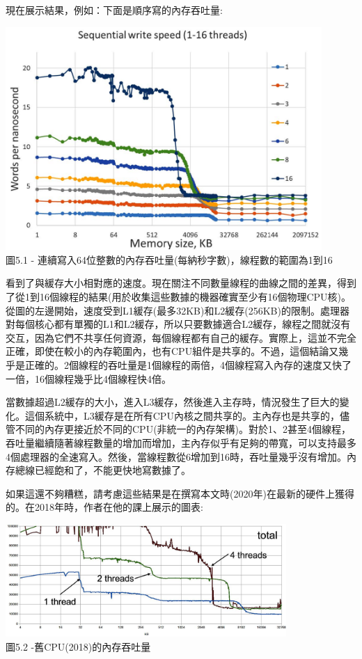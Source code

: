 現在展示結果，例如：下面是順序寫的內存吞吐量:

\begin{center}
\includegraphics[width=0.9\textwidth]{content/1/chapter5/images/1.jpg}\\
圖5.1 - 連續寫入64位整數的內存吞吐量(每納秒字數)，線程數的範圍為1到16
\end{center}

看到了與緩存大小相對應的速度。現在關注不同數量線程的曲線之間的差異，得到了從1到16個線程的結果(用於收集這些數據的機器確實至少有16個物理CPU核)。從圖的左邊開始，速度受到L1緩存(最多32KB)和L2緩存(256KB)的限制。處理器對每個核心都有單獨的L1和L2緩存，所以只要數據適合L2緩存，線程之間就沒有交互，因為它們不共享任何資源，每個線程都有自己的緩存。實際上，這並不完全正確，即使在較小的內存範圍內，也有CPU組件是共享的。不過，這個結論又幾乎是正確的。2個線程的吞吐量是1個線程的兩倍，4個線程寫入內存的速度又快了一倍，16個線程幾乎比4個線程快4倍。

當數據超過L2緩存的大小，進入L3緩存，然後進入主存時，情況發生了巨大的變化。這個系統中，L3緩存是在所有CPU內核之間共享的。主內存也是共享的，儘管不同的內存更接近於不同的CPU(非統一的內存架構)。對於1、2甚至4個線程，吞吐量繼續隨著線程數量的增加而增加，主內存似乎有足夠的帶寬，可以支持最多4個處理器的全速寫入。然後，當線程數從6增加到16時，吞吐量幾乎沒有增加。內存總線已經飽和了，不能更快地寫數據了。

如果這還不夠糟糕，請考慮這些結果是在撰寫本文時(2020年)在最新的硬件上獲得的。在2018年時，作者在他的課上展示的圖表:

\begin{center}
\includegraphics[width=0.8\textwidth]{content/1/chapter5/images/2.jpg}\\
圖5.2 -舊CPU(2018)的內存吞吐量
\end{center}

